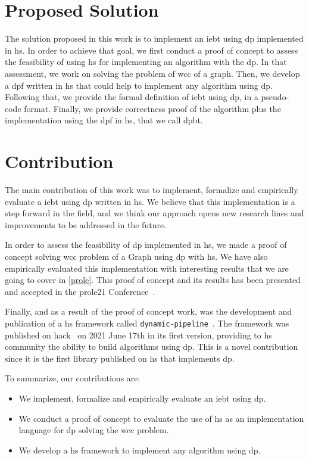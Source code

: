 \section{Proposed Solution}
The solution proposed in this work is to implement an \acrfull{iebt} using \acrfull{dp} implemented in \acrfull{hs}.
In order to achieve that goal, we first conduct a proof of concept to assess the feasibility of using \acrshort{hs} for implementing an algorithm with the \acrshort{dp}.
In that assessment, we work on solving the problem of \acrfull{wcc} of a graph. Then, we develop a \acrlong{dpf} written in \acrlong{hs} that could help to implement any algorithm using \acrshort{dp}.
Following that, we provide the formal definition of \acrshort{iebt} using \acrshort{dp}, in a pseudo-code format. 
Finally, we provide correctness proof of the algorithm plus the implementation using the \acrshort{dpf} in \acrshort{hs}, that we call \acrfull{dpbt}.

\section{Contribution}\label{sec:contrib}
The main contribution of this work was to implement, formalize and empirically evaluate a \acrlong{iebt} using \acrlong{dp} written in \acrshort{hs}.
We believe that this implementation is a step forward in the field, and we think our approach opens new research lines and improvements to be addressed in the future. 

In order to assess the feasibility of \acrshort{dp} implemented in \acrshort{hs}, we made a proof of concept solving \acrfull{wcc} problem of a Graph 
using \acrshort{dp} with \acrshort{hs}. We have also empirically evaluated this implementation with interesting results that we are going to cover in \autoref{prole}. 
This proof of concept and its results has been presented and accepted in the \acrfull{prole21} Conference~\cite{prole21}. 

Finally, and as a result of the proof of concept work, was the development and publication of a \acrshort{hs} framework called \texttt{dynamic-pipeline}~\cite{dynamic-pipeline}. 
The framework was published on \acrfull{hack}~\cite{hackage} on 2021 June 17th in its first version,
providing to \acrshort{hs} community the ability to build algorithms using \acrshort{dp}. This is a novel contribution since it is the first library published on \acrshort{hs}
that implements \acrshort{dp}.

To summarize, our contributions are:
\begin{itemize}
  \item We implement, formalize and empirically evaluate an \acrlong{iebt} using \acrlong{dp}.
  \item We conduct a proof of concept to evaluate the use of \acrlong{hs} as an implementation language for \acrlong{dp} solving the \acrlong{wcc} problem.
  \item We develop a \acrshort{hs} framework to implement any algorithm using \acrlong{dp}.
\end{itemize}

